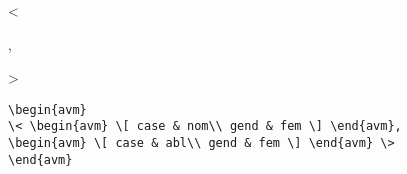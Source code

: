 \begin{examples}
\item \begin{avm}
< \begin{avm}  \end{avm}, 
\begin{avm}  \end{avm} >
\end{avm}

\item
{\obeyspaces\begin{verbatim}
\begin{avm}
\< \begin{avm} \[ case & nom\\ gend & fem \] \end{avm}, 
\begin{avm} \[ case & abl\\ gend & fem \] \end{avm} \>
\end{avm}
\end{verbatim}}
\end{examples}



